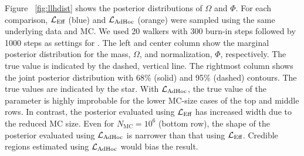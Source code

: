 Figure ~\ref{fig:llhdist} shows the posterior distributions of $\Omega$ and $\Phi$. For each comparison, $\mathcal{L}_\textmd{Eff}$ (blue) and $\mathcal{L}_{\textmd{AdHoc}}$ (orange) were sampled using the same underlying data and MC. We used 20 walkers with 300 burn-in steps followed by 1000 steps as settings for \emcee. The left and center column show the marginal posterior distribution for the mass, $\Omega$, and normalization, $\Phi$, respectively. The true value is indicated by the dashed, vertical line. The rightmost column shows the joint posterior distribution with 68\% (solid) and 95\% (dashed) contours. The true values are indicated by the star. With $\mathcal{L}_{\textmd{AdHoc}}$, the true value of the parameter is highly improbable for the lower MC-size cases of the top and middle rows. In contrast, the posterior evaluated using $\mathcal{L}_\textmd{Eff}$ has increased width due to the reduced MC size. Even for $N_\mathrm{MC}=10^6$ (bottom row), the shape of the posterior evaluated using $\mathcal{L}_{\textmd{AdHoc}}$ is narrower than that using $\mathcal{L}_\textmd{Eff}$. Credible regions estimated using $\mathcal{L}_{\textmd{AdHoc}}$ would bias the result.

